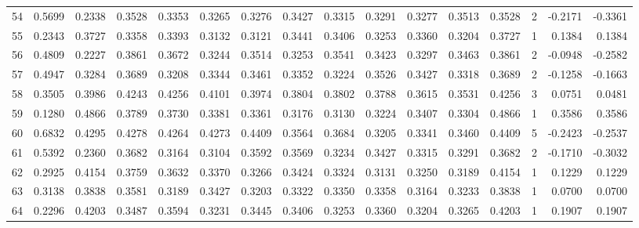 \begin{tabular}{lrrrrrrrrrrrrrrr}
54  &      0.5699 &  0.2338 &  0.3528 &  0.3353 &  0.3265 &  0.3276 &  0.3427 &  0.3315 &  0.3291 &  0.3277 &   0.3513 &     0.3528 &      2 &                   -0.2171 &                    -0.3361 \\
55  &      0.2343 &  0.3727 &  0.3358 &  0.3393 &  0.3132 &  0.3121 &  0.3441 &  0.3406 &  0.3253 &  0.3360 &   0.3204 &     0.3727 &      1 &                    0.1384 &                     0.1384 \\
56  &      0.4809 &  0.2227 &  0.3861 &  0.3672 &  0.3244 &  0.3514 &  0.3253 &  0.3541 &  0.3423 &  0.3297 &   0.3463 &     0.3861 &      2 &                   -0.0948 &                    -0.2582 \\
57  &      0.4947 &  0.3284 &  0.3689 &  0.3208 &  0.3344 &  0.3461 &  0.3352 &  0.3224 &  0.3526 &  0.3427 &   0.3318 &     0.3689 &      2 &                   -0.1258 &                    -0.1663 \\
58  &      0.3505 &  0.3986 &  0.4243 &  0.4256 &  0.4101 &  0.3974 &  0.3804 &  0.3802 &  0.3788 &  0.3615 &   0.3531 &     0.4256 &      3 &                    0.0751 &                     0.0481 \\
59  &      0.1280 &  0.4866 &  0.3789 &  0.3730 &  0.3381 &  0.3361 &  0.3176 &  0.3130 &  0.3224 &  0.3407 &   0.3304 &     0.4866 &      1 &                    0.3586 &                     0.3586 \\
60  &      0.6832 &  0.4295 &  0.4278 &  0.4264 &  0.4273 &  0.4409 &  0.3564 &  0.3684 &  0.3205 &  0.3341 &   0.3460 &     0.4409 &      5 &                   -0.2423 &                    -0.2537 \\
61  &      0.5392 &  0.2360 &  0.3682 &  0.3164 &  0.3104 &  0.3592 &  0.3569 &  0.3234 &  0.3427 &  0.3315 &   0.3291 &     0.3682 &      2 &                   -0.1710 &                    -0.3032 \\
62  &      0.2925 &  0.4154 &  0.3759 &  0.3632 &  0.3370 &  0.3266 &  0.3424 &  0.3324 &  0.3131 &  0.3250 &   0.3189 &     0.4154 &      1 &                    0.1229 &                     0.1229 \\
63  &      0.3138 &  0.3838 &  0.3581 &  0.3189 &  0.3427 &  0.3203 &  0.3322 &  0.3350 &  0.3358 &  0.3164 &   0.3233 &     0.3838 &      1 &                    0.0700 &                     0.0700 \\
64  &      0.2296 &  0.4203 &  0.3487 &  0.3594 &  0.3231 &  0.3445 &  0.3406 &  0.3253 &  0.3360 &  0.3204 &   0.3265 &     0.4203 &      1 &                    0.1907 &                     0.1907 \\

\end{tabular}
